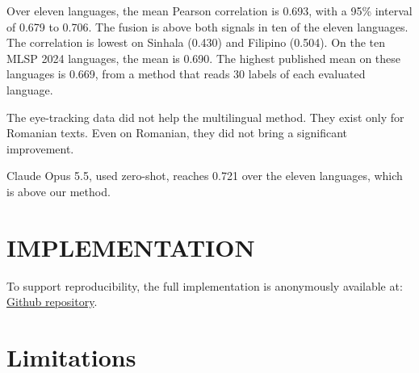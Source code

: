 Over eleven languages, the mean Pearson correlation is 0.693, with a 95\% interval of 0.679 to %
0.706. The fusion is above both signals in ten of the eleven languages. The correlation is lowest %
on Sinhala (0.430) and Filipino (0.504). On the ten MLSP 2024 languages, the mean is 0.690. The %
highest published mean on these languages is 0.669, from a method that reads 30 labels of each %
evaluated language.

The eye-tracking data did not help the multilingual method. They exist only for Romanian texts. %
Even on Romanian, they did not bring a significant improvement. %

Claude Opus 5.5, used zero-shot, reaches 0.721 over the eleven languages, which is above our %
method.

\section*{\uppercase{Implementation}}

\noindent To support reproducibility, the full implementation is anonymously available at: \href{https://anonymous.4open.science/r/zero-label-lcp}{Github repository}.

\section*{Limitations}

